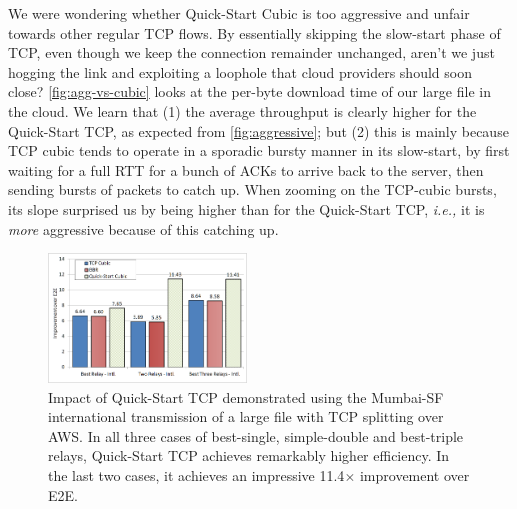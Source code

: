 \documentclass{hotnets17}
\newcommand{\mycomm}[3]{{\color{#2} \textbf{[#1: #3]}}}
\newcommand{\mycomm}[3]{}
\newcommand{\IK}[1]{\mycomm{IK}{blue}{#1}}
\newcommand{\NR}[1]{\mycomm{NR}{OliveGreen}{#1}}
\providecommand{\ie}{\emph{i.e.,} }
\begin{document}



We were wondering whether Quick-Start Cubic is too aggressive and unfair towards other regular TCP flows. By essentially skipping the slow-start phase of TCP, even though we keep the connection remainder unchanged, aren't we just hogging the link and exploiting a loophole
that cloud providers should soon close?
\autoref{fig:agg-vs-cubic} looks at the per-byte download time of our large file in the cloud. We learn that (1) the average throughput is clearly higher for the Quick-Start TCP, as expected from \autoref{fig:aggressive}; but (2) this is mainly because TCP cubic tends to operate in a sporadic bursty manner in its slow-start, by first waiting for a full RTT for a bunch of ACKs to arrive back to the server, then sending bursts of packets to catch up. When zooming on the TCP-cubic bursts, its slope surprised us by being higher than for the Quick-Start TCP, \ie it is \textit{more} aggressive because of this catching up. 



\begin{figure}[!t]
  \centering
    \includegraphics[width=0.47\textwidth,trim=2mm 2mm 2mm 2mm,clip]{figures/aggressive.png}
    \caption{Impact of Quick-Start TCP demonstrated using the Mumbai-SF international transmission of a large file with TCP splitting over AWS. In all three cases of best-single, simple-double and best-triple relays, Quick-Start TCP achieves remarkably higher efficiency. In the last two cases, it achieves an impressive 11.4$\times$ improvement over E2E.
   }
    \label{fig:aggressive}
\end{figure}
\end{document}
